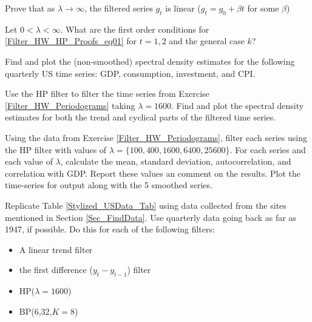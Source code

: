 \documentclass[letterpaper,11pt]{article}
\theoremstyle{definition}
\begin{document}
\begin{spacing}{1.5}
\begin{Exercise}
        Prove that as $\lambda \rightarrow \infty$, the filtered series $g_t$ is linear ($g_t = g_0 + \beta t$ for some $\beta$)

        Let $0 <\lambda < \infty$. What are the first order conditions for \ref{Filter_HW_HP_Proofs_eq01} for $t = 1, 2$ and the general case $k$?
    \end{Exercise}

    \begin{Exercise} \label{Filter_HW_Periodograms}
        Find and plot the (non-smoothed) spectral density estimates for the following quarterly US time series: GDP, consumption, investment, and CPI.
    \end{Exercise}

    \begin{Exercise} \label{Filter_HW_Periodograms_Filtered}
        Use the HP filter to filter the time series from Exercise \ref{Filter_HW_Periodograms} taking $\lambda = 1600$. Find and plot the spectral density estimates for both the trend and cyclical parts of the filtered time series.
    \end{Exercise}

    \begin{Exercise} \label{Filter_HW_Moments_HP}
        Using the data from Exercise \ref{Filter_HW_Periodograms}, filter each series using the HP filter with values of $\lambda=\{100,400,1600,6400,25600\}$.  For each series and each value of $\lambda$,
        calculate the mean, standard deviation, autocorrelation, and correlation with GDP.  Report these values an comment on the results.  Plot the time-series for output along with the 5 smoothed series.
    \end{Exercise}

    \begin{Exercise} \label{Filter_HW_Moments}
        Replicate Table \ref{Stylized_USData_Tab} using data collected from the sites mentioned in Section \ref{Sec_FindData}.  Use quarterly data going back as far as 1947, if possible.  Do this for each of the following filters:
        \begin{itemize}
          \setlength\itemsep{0em}
          \item A linear trend filter
          \item the first difference ($y_t - y_{t-1}$) filter
          \item HP($\lambda=1600$)
          \item BP(6,32,$K=8$)
        \end{itemize}
    \end{Exercise}

\end{spacing}

\newpage


\end{document}
